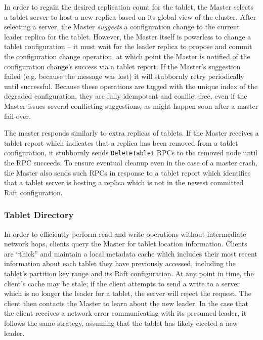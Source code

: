 \documentclass{vldb}
\begin{document}
In order to regain the desired replication count for the tablet, the Master selects
a tablet server to host a new replica based on its global view of the cluster.
After selecting a server, the Master {\em suggests} a configuration change to the current
leader replica for the tablet. However, the Master itself is powerless to change
a tablet configuration -- it must wait for the leader replica to propose and commit
the configuration change operation, at which point the Master is notified of the configuration
change's success via a tablet report. If the Master's suggestion failed (e.g. because the message was lost)
it will stubbornly retry periodically until successful. Because these operations
are tagged with the unique index of the degraded configuration, they are fully
idempotent and conflict-free, even if the Master issues several conflicting
suggestions, as might happen soon after a master fail-over.

The master responds similarly to extra replicas of tablets. If the Master receives a tablet
report which indicates that a replica has been removed from a tablet configuration, it stubbornly
sends {\tt DeleteTablet} RPCs to the removed node until the RPC succeeds. To ensure eventual cleanup
even in the case of a master crash, the Master also sends such RPCs in response to a tablet report
which identifies that a tablet server is hosting a replica which is not in the newest committed Raft
configuration.


\subsubsection{Tablet Directory}
\label{tablet_directory}

In order to efficiently perform read and write operations without intermediate network hops,
clients query the Master for tablet location information. Clients are ``thick'' and maintain
a local metadata cache which includes their most recent information about each tablet they
have previously accessed, including the tablet's partition key range and its Raft configuration.
At any point in time, the client's cache may be stale; if the client attempts to send a write
to a server which is no longer the leader for a tablet, the server will reject the request.
The client then contacts the Master to learn about the new leader. In the case that the
client receives a network error communicating with its presumed leader, it follows the same
strategy, assuming that the tablet has likely elected a new leader.
\end{document}
